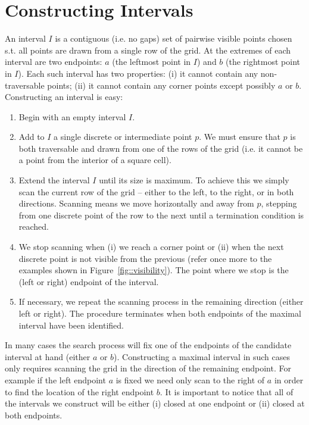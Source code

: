 \section{Constructing Intervals}
An interval $I$ is a contiguous (i.e. no gaps) set of pairwise visible points
chosen s.t. all points are drawn from a single row of the grid.
At the extremes of each interval are two endpoints: $a$ (the leftmost point in $I$) 
and $b$ (the rightmost point in $I$).
Each such interval has two properties:
(i) it cannot contain any non-traversable points; (ii)
it cannot contain any corner points except possibly $a$ or $b$.  
Constructing an interval is easy: 
\begin{enumerate}
\item Begin with an empty interval $I$.
\item Add to $I$ a single discrete or intermediate point $p$. We must ensure
that $p$ is both traversable and drawn from one of the rows of the grid
(i.e. it cannot be a point from the interior of a square cell).
\item Extend the interval $I$ until its size is maximum. To achieve this we
 simply scan the current row of the grid -- either to the left, to the right,
or in both directions. Scanning means we move horizontally and away from $p$, 
stepping from one discrete point of the row to the next until a termination 
condition is reached.
\item We stop scanning when (i) we reach a corner point or (ii) when the next
discrete point is not visible from the previous (refer once more to
the examples shown in Figure~\ref{fig::visibility}).
The point where we stop is the (left or right) endpoint of the 
interval. 
\item If necessary, we repeat the scanning process in the remaining direction
(either left or right).
The procedure terminates when both endpoints of the maximal interval have been 
identified.
\end{enumerate}

In many cases the search process will fix one of the endpoints of the candidate interval 
at hand (either $a$ or $b$). Constructing a maximal interval in such cases only requires 
scanning the grid in the direction of the remaining endpoint. For example if the left 
endpoint $a$ is fixed we need only scan to the right of $a$ in order to find the location 
of the right endpoint $b$.
It is important to notice that all of the intervals we construct will be either (i) 
closed at one endpoint or (ii) closed at both endpoints. 
